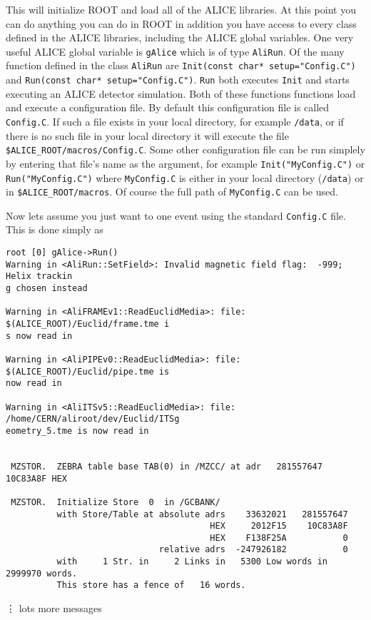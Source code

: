 This will initialize ROOT and load all of the ALICE libraries. At this point you
can do anything you can do in ROOT in addition you have access to every class
defined in the ALICE libraries, including the ALICE global variables. One very
useful ALICE global variable is \texttt{gAlice} which is of type
\texttt{AliRun}. Of the many function defined in the class \texttt{AliRun} are
\texttt{Init(const char* setup="Config.C")} and 
\texttt{Run(const char* setup="Config.C")}. \texttt{Run} both executes
\texttt{Init} and starts executing an ALICE detector simulation. Both of these
functions functions load and execute a configuration file. By default this
configuration file is called \texttt{Config.C}. If such a file exists in your
local directory, for example \texttt{/data}, or if there is no such file in
your local directory it will execute the file
\texttt{\$ALICE\_ROOT/macros/Config.C}. Some other configuration file can be
run simplely by entering that file's name as the argument, for example
\texttt{Init("MyConfig.C")} or \texttt{Run("MyConfig.C")} where
\texttt{MyConfig.C} is either in your local directory (\texttt{/data}) or in
\texttt{\$ALICE\_ROOT/macros}. Of course the full path of \texttt{MyConfig.C}
can be used.

Now lets assume you just want to one event using the standard \texttt{Config.C}
file. This is done simply as
\begin{verbatim}
root [0] gAlice->Run()
Warning in <AliRun::SetField>: Invalid magnetic field flag:  -999; Helix trackin
g chosen instead

Warning in <AliFRAMEv1::ReadEuclidMedia>: file: $(ALICE_ROOT)/Euclid/frame.tme i
s now read in

Warning in <AliPIPEv0::ReadEuclidMedia>: file: $(ALICE_ROOT)/Euclid/pipe.tme is 
now read in

Warning in <AliITSv5::ReadEuclidMedia>: file: /home/CERN/aliroot/dev/Euclid/ITSg
eometry_5.tme is now read in


 MZSTOR.  ZEBRA table base TAB(0) in /MZCC/ at adr   281557647    10C83A8F HEX

 MZSTOR.  Initialize Store  0  in /GCBANK/
          with Store/Table at absolute adrs    33632021   281557647
                                        HEX     2012F15    10C83A8F
                                        HEX    F138F25A           0
                              relative adrs  -247926182           0
          with     1 Str. in     2 Links in   5300 Low words in 2999970 words.
          This store has a fence of   16 words.
\end{verbatim}
\vdots
lots more messages

